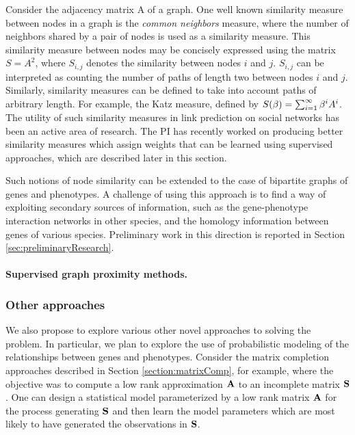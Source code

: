 Consider the adjacency matrix A of a graph. One well known similarity measure between nodes in a graph is the \textit{common neighbors} measure, where the number of neighbors shared by a pair of nodes is used as a similarity measure. This similarity measure between nodes may be concisely expressed using the matrix $S = A^{2}$, where $S_{i, j}$ denotes the similarity between nodes $i$ and $j$. $S_{i,j}$ can be interpreted as counting the number of paths of length two between nodes $i$ and $j$. Similarly, similarity measures can be defined to take into account paths of arbitrary length. For example, the Katz measure, defined by $S(\beta) = \sum_{i=1}^{\infty} \beta^{i}A^{i}$. The utility of such similarity measures in link prediction on social networks has been an active area of research. The PI has recently worked on producing better similarity measures which assign weights that can be learned using supervised approaches\cite{berkantSupervised}, which are described later in this section.

Such notions of node similarity can be extended to the case of bipartite graphs of genes and phenotypes. A challenge of using this approach is to find a way of exploiting secondary sources of information, such as the gene-phenotype interaction networks in other species, and the homology information between genes of various species. Preliminary work in this direction is reported in Section \ref{sec:preliminaryResearch}.

\paragraph*{Supervised graph proximity methods.}


\subsubsection{Other approaches}
We also propose to explore various other novel approaches to solving the problem. In particular, we plan to explore the use of probabilistic modeling of the relationships between genes and phenotypes. Consider the matrix completion approaches described in Section \ref{section:matrixComp}, for example, where the objective was to compute a low rank approximation $\mathbf{A}$ to an incomplete matrix $\mathbf{S}$. One can design a statistical model parameterized by a low rank matrix $\mathbf{A}$ for the process generating $\mathbf{S}$ and then learn the model parameters which are most likely to have generated the observations in $\mathbf{S}$.

